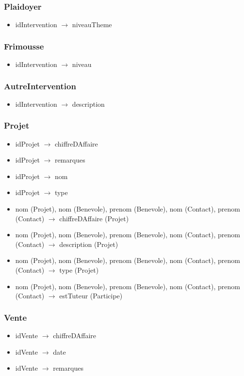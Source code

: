 \subsubsection*{Plaidoyer}
\begin{itemize}
\item[]	idIntervention $\rightarrow$ niveauTheme
\end{itemize}

\subsubsection*{Frimousse}
\begin{itemize}
\item[] idIntervention $\rightarrow$ niveau
\end{itemize}

\subsubsection*{AutreIntervention}
\begin{itemize}
\item[] idIntervention $\rightarrow$ description
\end{itemize}

\subsubsection*{Projet}
\begin{itemize}
\item[] idProjet $\rightarrow$ chiffreDAffaire
\item[] idProjet $\rightarrow$ remarques
\item[] idProjet $\rightarrow$ nom
\item[] idProjet $\rightarrow$ type
\item[]	nom (Projet), nom (Benevole), prenom (Benevole), nom (Contact), prenom (Contact) $\rightarrow$ chiffreDAffaire (Projet)
\item[]	nom (Projet), nom (Benevole), prenom (Benevole), nom (Contact), prenom (Contact) $\rightarrow$ description (Projet)
\item[]	nom (Projet), nom (Benevole), prenom (Benevole), nom (Contact), prenom (Contact) $\rightarrow$ type (Projet)
\item[]	nom (Projet), nom (Benevole), prenom (Benevole), nom (Contact), prenom (Contact) $\rightarrow$ estTuteur (Participe)
\end{itemize}

\subsubsection*{Vente}
\begin{itemize}
\item[]	idVente $\rightarrow$ chiffreDAffaire
\item[]	idVente $\rightarrow$ date
\item[]	idVente $\rightarrow$ remarques
\end{itemize}

